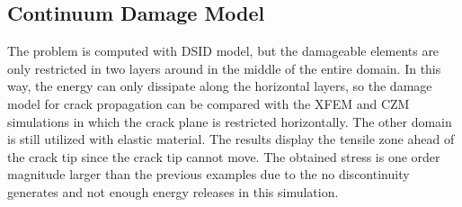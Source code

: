 \documentclass[preprint,review,12pt]{elsarticle}
\begin{document}
\subsection{Continuum Damage Model}
\noindent
The problem is computed with DSID model, but the damageable elements are only restricted in two layers around in the middle of the entire domain. In this way, the energy can only dissipate along the horizontal layers, so the damage model for crack propagation can be compared with the XFEM and CZM simulations in which the crack plane is restricted horizontally. The other domain is still utilized with elastic material. The results display the tensile zone ahead of the crack tip since the crack tip cannot move. The obtained stress is one order magnitude larger than the previous examples due to the no discontinuity generates and not enough energy releases in this simulation.
\
\\
\end{document}
